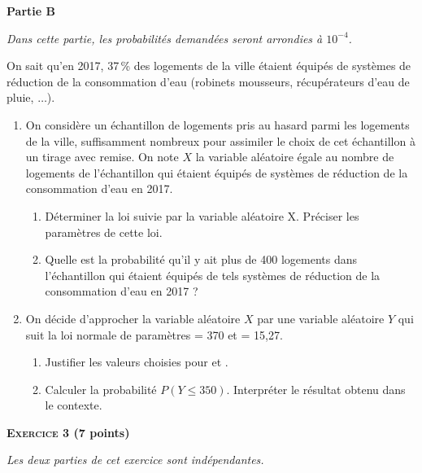 \documentclass[10pt,a4paper,french]{article}
\begin{document}
\medskip

\textbf{Partie B}

\medskip

\emph{Dans cette partie, les probabilités demandées seront arrondies à $10^{-4}$.}

\medskip

On sait qu’en 2017, 37\,\% des logements de la ville étaient équipés de systèmes de réduction de la
consommation d’eau (robinets mousseurs, récupérateurs d’eau de pluie, $\dots$).

\medskip

\begin{enumerate}
\item On considère un échantillon de  logements pris au hasard parmi les logements de la ville,
suffisamment nombreux pour assimiler le choix de cet échantillon à un tirage avec remise. On note
$X$ la variable aléatoire égale au nombre de logements de l’échantillon qui étaient équipés de
systèmes de réduction de la consommation d’eau en 2017.
	\begin{enumerate}
		\item Déterminer la loi suivie par la variable aléatoire X. Préciser les paramètres de cette loi.
		\item Quelle est la probabilité qu’il y ait plus de 400 logements dans l’échantillon qui étaient
équipés de tels systèmes de réduction de la consommation d’eau en 2017 ?
	\end{enumerate}
\item On décide d’approcher la variable aléatoire $X$ par une variable aléatoire $Y$ qui suit la loi normale de
paramètres \textmu = 370 et \textsigma = 15,27.
	\begin{enumerate}
		\item Justifier les valeurs choisies pour \textmu{} et \textsigma.
		\item Calculer la probabilité $P(Y \leqslant 350)$. Interpréter le résultat obtenu dans le contexte.
	\end{enumerate}
\end{enumerate}

\vspace{0,25cm}

\textbf{\textsc{Exercice 3} \hfill (7 points)}  

\vspace{0.25cm}

\emph{Les deux parties de cet exercice sont indépendantes.}

\medskip
\end{document}
